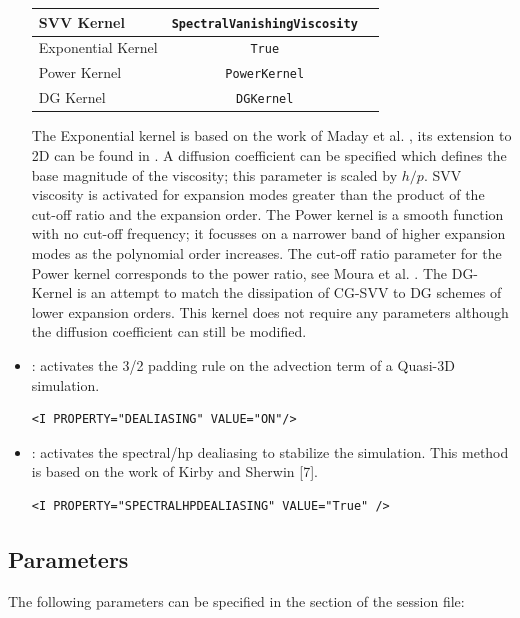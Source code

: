 \begin{itemize}
\begin{center}
\footnotesize
\begin{tabular}{lcc}
\toprule
{SVV Kernel} & {\texttt{SpectralVanishingViscosity}} \\
\midrule
Exponential Kernel & \texttt{True} \\
Power Kernel & \texttt{PowerKernel} \\
DG Kernel & \texttt{DGKernel} \\
\bottomrule
\end{tabular}
\end{center}

The Exponential kernel is based on the work of Maday et al. \cite{yvsiouei93},
its extension to 2D can be found in \cite{rosh06}. A diffusion coefficient can
be specified which defines the base magnitude of the viscosity; this parameter
is scaled by $h/p$. SVV viscosity is activated for expansion modes greater than
the product of the cut-off ratio and the expansion order. The Power kernel is a
smooth function with no cut-off frequency; it focusses on a narrower band of
higher expansion modes as the polynomial order increases. The cut-off ratio
parameter for the Power kernel corresponds to the power ratio, see Moura et al.
\cite{rospjo16}. The DG-Kernel is an attempt to match the dissipation of CG-SVV
to DG schemes of lower expansion orders. This kernel does not require any parameters
although the diffusion coefficient can still be modified.   

\item {}: activates the 3/2 padding rule on the advection term
of a Quasi-3D simulation.
\begin{lstlisting}[style=XMLStyle]
<I PROPERTY="DEALIASING" VALUE="ON"/>
\end{lstlisting}


\item {}: activates the spectral/hp dealiasing to
stabilize the simulation. This method is based on the work of Kirby and Sherwin [7].
\begin{lstlisting}[style=XMLStyle]
<I PROPERTY="SPECTRALHPDEALIASING" VALUE="True" />
\end{lstlisting}

\end{itemize}

\subsection{Parameters}
The following parameters can be specified in the  section of
the session file:

